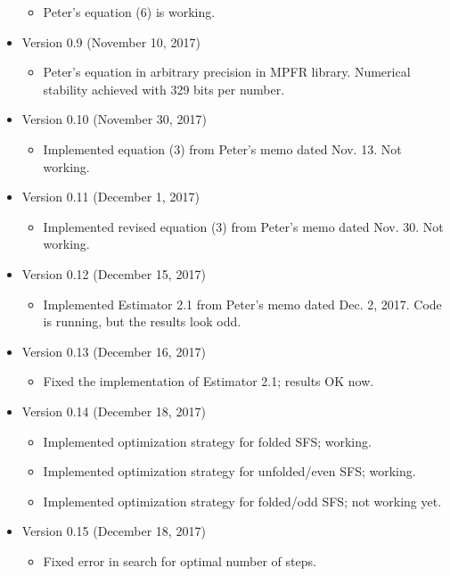 \documentclass[a4paper]{article}
\begin{document}
\begin{itemize}
\begin{itemize}
    \item Peter's equation (6) is working.
  \end{itemize}
\item Version 0.9 (November 10, 2017)
  \begin{itemize}
  \item Peter's equation in arbitrary precision in MPFR
    library. Numerical stability achieved with 329 bits per number.
  \end{itemize}
\item Version 0.10 (November 30, 2017)
  \begin{itemize}
  \item Implemented equation (3) from Peter's memo dated Nov. 13. Not
    working.
  \end{itemize}
\item Version 0.11 (December 1, 2017)
  \begin{itemize}
  \item Implemented revised equation (3) from Peter's memo dated Nov. 30. Not
    working.
  \end{itemize}
\item Version 0.12 (December 15, 2017)
  \begin{itemize}
    \item Implemented Estimator 2.1 from Peter's memo dated Dec. 2,
      2017. Code is running, but the results look odd.
  \end{itemize}
\item Version 0.13 (December 16, 2017)
  \begin{itemize}
  \item Fixed the implementation of Estimator 2.1; results OK now.
  \end{itemize}
\item Version 0.14 (December 18, 2017)
  \begin{itemize}
  \item Implemented optimization strategy for folded SFS; working.
  \item Implemented optimization strategy for unfolded/even SFS;
    working.
  \item Implemented optimization strategy for folded/odd SFS; not
    working yet.
  \end{itemize}
\item Version 0.15 (December 18, 2017)
  \begin{itemize}
  \item Fixed error in search for optimal number of steps.
  \end{itemize}

\end{itemize}
\end{document}
